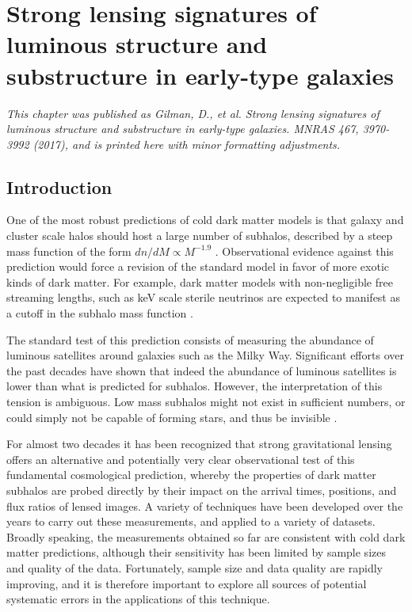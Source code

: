 \def\kex{{\kappa_{\rm e}}}
\def\RE{{R_{\rm E}}}
\def\Reff{{R_{\rm eff}}}
\def\gd{{\gamma_{\rm d}}}
\def\fd{{f_{\rm dm}}}
\def\ra{{r_{\rm a}}}

\chapter{Strong lensing signatures of luminous structure and substructure in early-type galaxies}
\textit{This chapter was published as Gilman, D., et al. Strong lensing signatures of luminous structure and substructure in early-type galaxies. MNRAS 467, 3970-3992 (2017), and is printed here with minor formatting adjustments.}

\section{Introduction}

One of the most robust predictions of cold dark matter models is that
galaxy and cluster scale halos should host a large number of subhalos,
described by a steep mass function of the form $dn/dM\propto M^{-1.9}$ \cite{Klypin++99,MaoSchnieder98}. Observational evidence against this prediction would force a revision of the standard model in favor of more exotic kinds of dark matter. For example, dark matter models with non-negligible free streaming lengths, such as keV scale sterile neutrinos are expected to manifest as a cutoff in the subhalo mass function \cite{Colombi++96,Vogelsberger++16,Bose++16,Lovell++16,Menci++16}.

The standard test of this prediction consists of measuring the abundance of luminous satellites around galaxies such as the Milky Way. Significant efforts over the past decades have shown that indeed the abundance of luminous satellites is lower than what is predicted for subhalos. However, the interpretation of this tension is ambiguous. Low mass subhalos might not exist in sufficient numbers, or could simply not be capable of forming stars, and thus be invisible \cite{Nierenberg++14,Nierenberg++16,Gao++11,Starkenburg++13,Wetzel++16,Sawala++16,DespVeg16}.

For almost two decades it has been recognized that strong gravitational lensing offers an alternative and potentially very clear observational test of this fundamental cosmological prediction, whereby the properties of dark matter subhalos are probed directly by their impact on the arrival times, positions, and flux ratios of lensed images. A variety of techniques have been developed over the years to carry out these measurements, and applied to a variety of datasets. Broadly speaking, the measurements obtained so far are consistent with cold dark matter predictions, although their sensitivity has been limited by sample sizes and quality of the data. Fortunately, sample size and data quality are rapidly improving, and it is therefore important to explore all sources of potential systematic errors in the applications of this technique.

